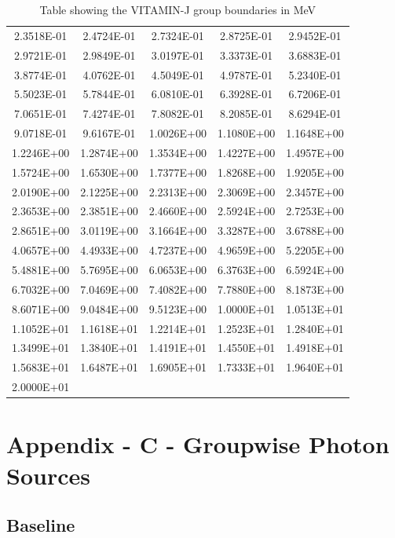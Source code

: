 \documentclass[12pt]{article}
\begin{document}
\begin{centering}
\begin{table}[ht!]
\begin{tabular}{| c  c  c  c  c |}
  2.3518E-01 & 2.4724E-01 & 2.7324E-01 & 2.8725E-01 & 2.9452E-01\\
  2.9721E-01 & 2.9849E-01 & 3.0197E-01 & 3.3373E-01 & 3.6883E-01\\
  3.8774E-01 & 4.0762E-01 & 4.5049E-01 & 4.9787E-01 & 5.2340E-01\\
  5.5023E-01 & 5.7844E-01 & 6.0810E-01 & 6.3928E-01 & 6.7206E-01\\
  7.0651E-01 & 7.4274E-01 & 7.8082E-01 & 8.2085E-01 & 8.6294E-01\\
  9.0718E-01 & 9.6167E-01 & 1.0026E+00 & 1.1080E+00 & 1.1648E+00\\
  1.2246E+00 & 1.2874E+00 & 1.3534E+00 & 1.4227E+00 & 1.4957E+00\\
  1.5724E+00 & 1.6530E+00 & 1.7377E+00 & 1.8268E+00 & 1.9205E+00\\
  2.0190E+00 & 2.1225E+00 & 2.2313E+00 & 2.3069E+00 & 2.3457E+00\\
  2.3653E+00 & 2.3851E+00 & 2.4660E+00 & 2.5924E+00 & 2.7253E+00\\
  2.8651E+00 & 3.0119E+00 & 3.1664E+00 & 3.3287E+00 & 3.6788E+00\\
  4.0657E+00 & 4.4933E+00 & 4.7237E+00 & 4.9659E+00 & 5.2205E+00\\
  5.4881E+00 & 5.7695E+00 & 6.0653E+00 & 6.3763E+00 & 6.5924E+00\\
  6.7032E+00 & 7.0469E+00 & 7.4082E+00 & 7.7880E+00 & 8.1873E+00\\
  8.6071E+00 & 9.0484E+00 & 9.5123E+00 & 1.0000E+01 & 1.0513E+01\\
  1.1052E+01 & 1.1618E+01 & 1.2214E+01 & 1.2523E+01 & 1.2840E+01\\
  1.3499E+01 & 1.3840E+01 & 1.4191E+01 & 1.4550E+01 & 1.4918E+01\\
  1.5683E+01 & 1.6487E+01 & 1.6905E+01 & 1.7333E+01 & 1.9640E+01\\
  2.0000E+01 & & & & \\ 
  \hline
\end{tabular}
\caption{Table showing the VITAMIN-J group boundaries in MeV}
\label{tab:vitamin_j}
\end{table}
\end{centering}

\newpage
\clearpage
\section{Appendix - C - Groupwise Photon Sources}
\subsection{Baseline}
\label{appendix:grp_photon_src_baseline}
\end{document}
